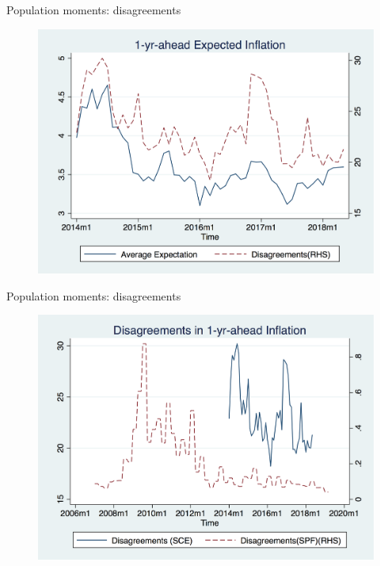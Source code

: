 \documentclass{beamer}
\begin{document}
\begin{frame}{Population moments: disagreements}
\begin{figure}
	\includegraphics[scale=0.3]{figures/mean_disg.png} 
\end{figure}
\end{frame}


\begin{frame}{Population moments: disagreements}
\begin{figure}
	\includegraphics[scale=0.3]{figures/disg_disg.png} 
\end{figure}
\end{frame}
\end{document}
